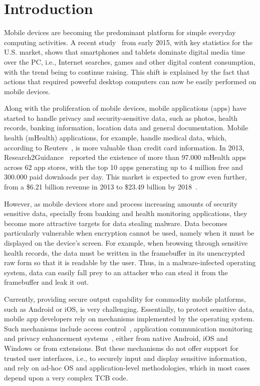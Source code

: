 
% 
% 
\section{Introduction}


Mobile devices are becoming the predominant platform for simple everyday computing activities.  A recent study~\cite{comscore} from early 2015, with key statistics for the U.S. market, shows that smartphones and tablets dominate digital media time over the \ac{PC}, i.e., Internet searches, games and other digital content consumption, with the trend being to continue raising. This shift is explained by the fact that actions that required powerful desktop computers can now be easily performed on mobile devices.

Along with the proliferation of mobile devices, mobile applications (apps) have started to handle privacy and security-sensitive data, such as photos, health records, banking information, location data and general documentation. Mobile health (mHealth) applications, for example, handle medical data, which, according to Reuters~\cite{reuters}, is more valuable than credit card information. In 2013, Research2Guidance~\cite{research2guidance} reported the existence of more than 97.000 mHealth apps across 62 app stores, with the top 10 apps generating up to 4 million free and 300.000 paid downloads per day. This market is expected to grow even further, from a \$6.21 billion revenue in 2013 to \$23.49 billion by 2018~\cite{marketsandmarkets}.

However, as mobile devices store and process increasing amounts of security sensitive data, specially from banking and health monitoring applications, they become more attractive targets for data stealing malware. Data becomes particularly vulnerable when encryption cannot be used, namely when it must be displayed on the device's screen. For example, when browsing through sensitive health records, the data must be written in the framebuffer in its unencrypted raw form so that it is readable by the user. Thus, in a malware-infected operating system, data can easily fall prey to an attacker who can steal it from the framebuffer and leak it out.

Currently, providing secure output capability for commodity mobile platforms, such as Android or iOS, is very challenging. Essentially, to protect sensitive data, mobile app developers rely on mechanisms implemented by the operating system. Such mechanisms include access control~\cite{smalley2013security,kern2012permission,conti2011crepe,heuser2014asm}, application communication monitoring~\cite{ongtang2012semantically,dietz2011quire,bugiel2011xmandroid} and privacy enhancement systems~\cite{beresford2011mockdroid,zhou2011taming,shebaro2014identidroid,enck2014taintdroid}, either from native Android, iOS and Windows or from extensions. But these mechanisms do not offer support for trusted user interfaces, i.e., to securely input and display sensitive information, and rely on ad-hoc \ac{OS} and application-level methodologies, which in most cases depend upon a very complex \ac{TCB} code.

